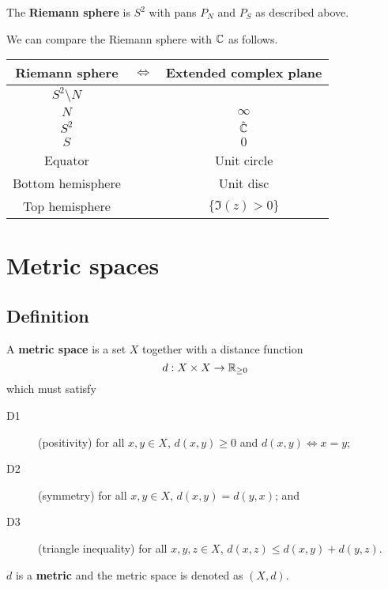 \begin{definition}
    The \textbf{Riemann sphere} is $S^2$ with pans $P_N$ and $P_S$ as described above.
\end{definition}

We can compare the Riemann sphere with $\mathbb{C}$ as follows.

\begin{center}
    \begin{tabular}{ccc}
        \toprule
        Riemann sphere & $\iff$ & Extended complex plane \\
        \midrule
        $S^2 \setminus N$ && \C \\
        $N$ && $\infty$ \\
        $S^2$ && $\hat {\mathbb{C}}$ \\
        $S$ && $0$ \\
        Equator && Unit circle \\
        Bottom hemisphere && Unit disc \\
        Top hemisphere && $\{ \Im{(z)} > 0 \}$ \\
        \bottomrule
    \end{tabular}
\end{center}

\chapter{Metric spaces}
\section{Definition}

\begin{definition}
    A \textbf{metric space} is a set $X$ together with a distance function 
    \[ d: X \times X \to \mathbb{R}_{\geq 0} \]
    which must satisfy
    \begin{description}
        \item[D1] (positivity) for all $x, y \in X$, $d(x, y) \geq 0$ and $d(x, y) \iff x = y$;
        \item[D2] (symmetry) for all $x, y \in X$, $d(x, y) = d(y, x)$; and
        \item[D3] (triangle inequality) for all $x, y, z \in X$, $d(x, z) \leq d(x, y) + d(y, z)$.
    \end{description}
    $d$ is a \textbf{metric} and the metric space is denoted as $(X, d)$.
\end{definition}

